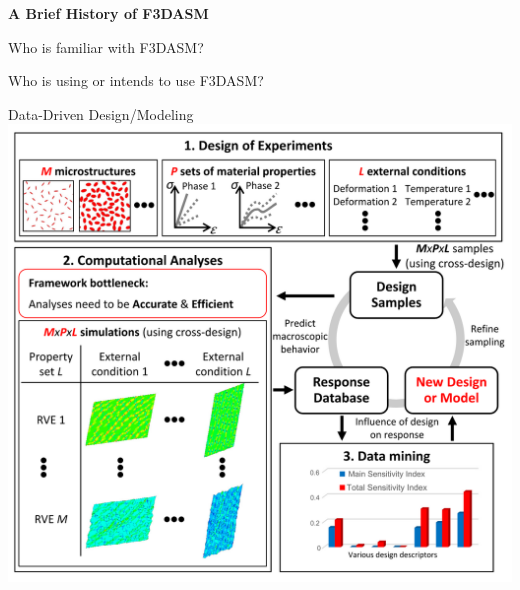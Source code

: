 \documentclass[aspectratio=169]{beamer}
\author{\authorlabel}
\newcommand{\mysubtitle}{\color{Pink}\Large{\textbf{A Brief History of F3DASM}}}
\begin{document}
{

\def\beamer@entrycode{\vspace*{-\headheight}}
}

\begin{frame}
  \centering
  \mysubtitle
\end{frame}

\begin{frame}
  \centering
  \color{Pink} Who is familiar with F3DASM?
\end{frame}

\begin{frame}
  \centering
  \color{Pink} Who is using or intends to use F3DASM?
\end{frame}


\begin{frame}{Data-Driven Design/Modeling}
  \centering
  \includegraphics[height=0.8\textheight]{Figures/DDD.png}
\end{frame}
\end{document}
